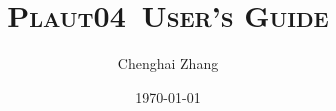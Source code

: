 \documentclass[12pt, openright, psfig]{article}
\newcommand{\PLAUT} {\textsc{Plaut04}}
\begin{document}
	\title{\textsc{\PLAUT~User's Guide}}
	\author{Chenghai Zhang} 

	\date{\today}
	\maketitle
\clearpage


\end{document}
